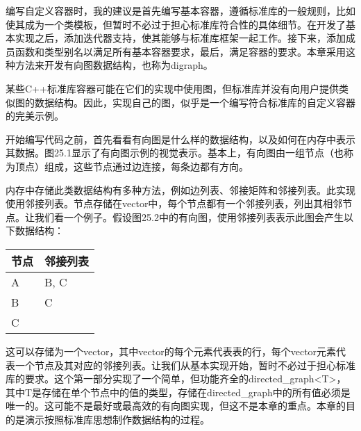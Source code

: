 编写自定义容器时，我的建议是首先编写基本容器，遵循标准库的一般规则，比如使其成为一个类模板，但暂时不必过于担心标准库符合性的具体细节。在开发了基本实现之后，添加迭代器支持，使其能够与标准库框架一起工作。接下来，添加成员函数和类型别名以满足所有基本容器要求，最后，满足容器的要求。本章采用这种方法来开发有向图数据结构，也称为digraph。


某些C++标准库容器可能在它们的实现中使用图，但标准库并没有向用户提供类似图的数据结构。因此，实现自己的图，似乎是一个编写符合标准库的自定义容器的完美示例。

开始编写代码之前，首先看看有向图是什么样的数据结构，以及如何在内存中表示其数据。图25.1显示了有向图示例的视觉表示。基本上，有向图由一组节点（也称为顶点）组成，这些节点通过边连接，每条边都有方向。


内存中存储此类数据结构有多种方法，例如边列表、邻接矩阵和邻接列表。此实现使用邻接列表。节点存储在vector中，每个节点都有一个邻接列表，列出其相邻节点。让我们看一个例子。假设图25.2中的有向图，使用邻接列表表示此图会产生以下数据结构：


\begin{longtable}{|l|l|}
\hline
\textbf{节点} & \textbf{邻接列表} \\ \hline
\endfirsthead
%
\endhead
%
A             & B, C                    \\ \hline
B             & C                       \\ \hline
C             &                         \\ \hline
\end{longtable}

这可以存储为一个vector，其中vector的每个元素代表表的行，每个vector元素代表一个节点及其对应的邻接列表。让我们从基本实现开始，暂时不必过于担心标准库的要求。这个第一部分实现了一个简单，但功能齐全的directed\_graph<T>，其中T是存储在单个节点中的值的类型，存储在directed\_graph中的所有值必须是唯一的。这可能不是最好或最高效的有向图实现，但这不是本章的重点。本章的目的是演示按照标准库思想制作数据结构的过程。


